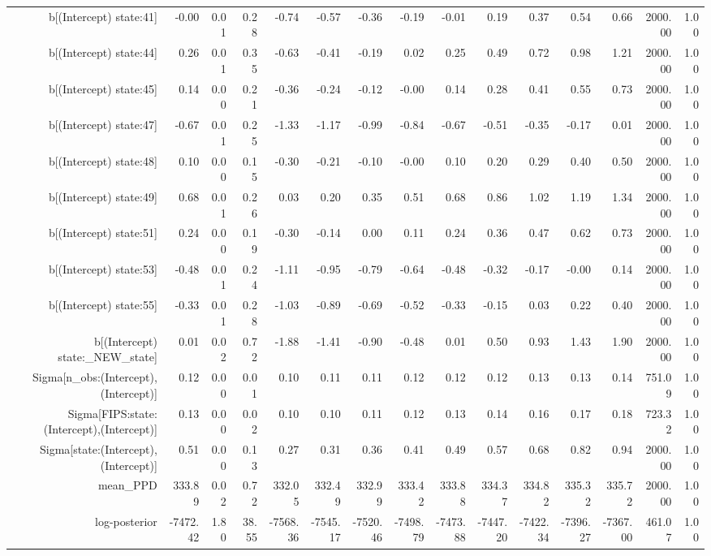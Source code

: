 \begin{table}[ht]
\begin{tabular}{rrrrrrrrrrrrrrr}
  b[(Intercept) state:41] & -0.00 & 0.01 & 0.28 & -0.74 & -0.57 & -0.36 & -0.19 & -0.01 & 0.19 & 0.37 & 0.54 & 0.66 & 2000.00 & 1.00 \\ 
  b[(Intercept) state:44] & 0.26 & 0.01 & 0.35 & -0.63 & -0.41 & -0.19 & 0.02 & 0.25 & 0.49 & 0.72 & 0.98 & 1.21 & 2000.00 & 1.00 \\ 
  b[(Intercept) state:45] & 0.14 & 0.00 & 0.21 & -0.36 & -0.24 & -0.12 & -0.00 & 0.14 & 0.28 & 0.41 & 0.55 & 0.73 & 2000.00 & 1.00 \\ 
  b[(Intercept) state:47] & -0.67 & 0.01 & 0.25 & -1.33 & -1.17 & -0.99 & -0.84 & -0.67 & -0.51 & -0.35 & -0.17 & 0.01 & 2000.00 & 1.00 \\ 
  b[(Intercept) state:48] & 0.10 & 0.00 & 0.15 & -0.30 & -0.21 & -0.10 & -0.00 & 0.10 & 0.20 & 0.29 & 0.40 & 0.50 & 2000.00 & 1.00 \\ 
  b[(Intercept) state:49] & 0.68 & 0.01 & 0.26 & 0.03 & 0.20 & 0.35 & 0.51 & 0.68 & 0.86 & 1.02 & 1.19 & 1.34 & 2000.00 & 1.00 \\ 
  b[(Intercept) state:51] & 0.24 & 0.00 & 0.19 & -0.30 & -0.14 & 0.00 & 0.11 & 0.24 & 0.36 & 0.47 & 0.62 & 0.73 & 2000.00 & 1.00 \\ 
  b[(Intercept) state:53] & -0.48 & 0.01 & 0.24 & -1.11 & -0.95 & -0.79 & -0.64 & -0.48 & -0.32 & -0.17 & -0.00 & 0.14 & 2000.00 & 1.00 \\ 
  b[(Intercept) state:55] & -0.33 & 0.01 & 0.28 & -1.03 & -0.89 & -0.69 & -0.52 & -0.33 & -0.15 & 0.03 & 0.22 & 0.40 & 2000.00 & 1.00 \\ 
  b[(Intercept) state:\_NEW\_state] & 0.01 & 0.02 & 0.72 & -1.88 & -1.41 & -0.90 & -0.48 & 0.01 & 0.50 & 0.93 & 1.43 & 1.90 & 2000.00 & 1.00 \\ 
  Sigma[n\_obs:(Intercept),(Intercept)] & 0.12 & 0.00 & 0.01 & 0.10 & 0.11 & 0.11 & 0.12 & 0.12 & 0.12 & 0.13 & 0.13 & 0.14 & 751.09 & 1.00 \\ 
  Sigma[FIPS:state:(Intercept),(Intercept)] & 0.13 & 0.00 & 0.02 & 0.10 & 0.10 & 0.11 & 0.12 & 0.13 & 0.14 & 0.16 & 0.17 & 0.18 & 723.32 & 1.00 \\ 
  Sigma[state:(Intercept),(Intercept)] & 0.51 & 0.00 & 0.13 & 0.27 & 0.31 & 0.36 & 0.41 & 0.49 & 0.57 & 0.68 & 0.82 & 0.94 & 2000.00 & 1.00 \\ 
  mean\_PPD & 333.89 & 0.02 & 0.72 & 332.05 & 332.49 & 332.99 & 333.42 & 333.88 & 334.37 & 334.82 & 335.32 & 335.72 & 2000.00 & 1.00 \\ 
  log-posterior & -7472.42 & 1.80 & 38.55 & -7568.36 & -7545.17 & -7520.46 & -7498.79 & -7473.88 & -7447.20 & -7422.34 & -7396.27 & -7367.00 & 461.07 & 1.00 \\ 
   \hline
\end{tabular}
\end{table}
